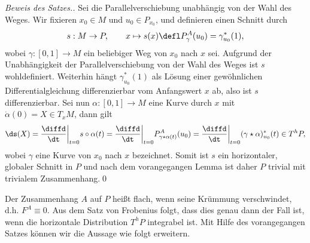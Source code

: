 \documentclass[%
	paper=a5,%
	fleqn,%
	DIV=18,%
	BCOR=0mm,
	fontsize=11pt,
	titlepage=false,%
	bibliography=totoc,
	DIV=18,%
	twoside=true,
	pdftitle=Riemannsche Geometrie,
	pdfauthor=Uwe Semmelmann,
	numbers=noendperiod]%
	{scrbook}
\begin{document}
\begin{proof}[Beweis des Satzes.]
Sei die Parallelverschiebung unabhängig von der Wahl des Weges. Wir fixieren
$x_0\in M$ und $u_0\in P_{x_0}$, und definieren einen Schnitt durch
\begin{align*}
s: M\to P,\qquad x\mapsto s(x) \defl P_\gamma^A(u_0) = \gamma_{u_0}^*(1),
\end{align*}
wobei $\gamma: [0,1]\to M$ ein beliebiger Weg von $x_0$ nach $x$ sei. Aufgrund
der Unabhängigkeit der Parallelverschiebung von der Wahl des Weges ist $s$
wohldefiniert. Weiterhin hängt $\gamma_{u_0}^*(1)$ als Lösung einer gewöhnlichen
Differentialgleichung differenzierbar vom Anfangswert $x$ ab, also ist $s$
differenzierbar. Sei nun $\alpha: [0,1]\to M$ eine Kurve durch $x$ mit
$\dot{\alpha}(0) = X\in T_xM$, dann gilt
\begin{align*}
\ds(X) = \frac{\diffd}{\dt}\bigg|_{t=0} s\circ\alpha(t)
= \frac{\diffd}{\dt}\bigg|_{t=0} P_{\gamma\star\alpha(t)}^A(u_0)
= \frac{\diffd}{\dt}\bigg|_{t=0} (\gamma\star\alpha)^*_{u_0}(t) \in T^hP,
\end{align*}
wobei $\gamma$ eine Kurve von $x_0$ nach $x$ bezeichnet. Somit ist $s$ ein
horizontaler, globaler Schnitt in $P$ und nach dem vorangegangen Lemma ist daher
$P$ trivial mit trivialem Zusammenhang.\qed 
\end{proof}

Der Zusammenhang $A$ auf $P$ heißt flach, wenn seine Krümmung verschwindet, d.h.
$F^A \equiv 0$. Aus dem Satz von Frobenius folgt, dass dies genau dann der Fall
ist, wenn die horizontale Distribution $T^hP$ integrabel ist. Mit Hilfe des
vorangegangen Satzes können wir die Aussage wie folgt erweitern.
\end{document}
